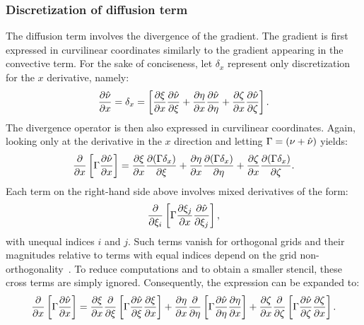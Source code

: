 \subsubsection{Discretization of diffusion term}
%
The diffusion term involves the divergence of the gradient. The gradient is first expressed in curvilinear coordinates similarly to the gradient appearing in the convective term. For the sake of conciseness, let $\delta_x$ represent only discretization for the $x$ derivative, namely:
\begin{equation*}
    \pdiff{\sa}{x} = \delta_x =
    \left[
        \pdiff{\xi}{x}\pdiff{\sa}{\xi} + \pdiff{\eta}{x}\pdiff{\sa}{\eta} +
            \pdiff{\zeta}{x}\pdiff{\sa}{\zeta}
    \right].
\end{equation*}
The divergence operator is then also expressed in curvilinear coordinates. Again, looking only at the derivative in the $x$ direction and letting $\Gamma = (\nu + \sa)$ yields:
\begin{equation*}
    \pdiff{}{x}\left[\Gamma\pdiff{\sa}{x}\right]
    =
    \pdiff{\xi}{x}\pdiff{(\Gamma\delta_x)}{\xi}
    + \pdiff{\eta}{x}\pdiff{(\Gamma\delta_x)}{\eta}
    + \pdiff{\zeta}{x}\pdiff{(\Gamma\delta_x)}{\zeta}.
\end{equation*}
Each term on the right-hand side above involves mixed derivatives of the form:
\begin{equation}
    \pdiff{}{\xi_i}\left[
        \Gamma\pdiff{\xi_j}{x}\pdiff{\sa}{\xi_j}
    \right],
\end{equation}
with unequal indices $i$ and $j$. Such terms vanish for orthogonal grids and their magnitudes relative to terms with equal indices depend on the grid non-orthogonality~\cite{ferziger2012computational}. To reduce computations and to obtain a smaller stencil, these cross terms are simply ignored. Consequently, the expression can be expanded to:
\begin{equation*}
    \pdiff{}{x}\left[\Gamma\pdiff{\sa}{x}\right] = \pdiff{\xi}{x}\pdiff{}{\xi}\left[
        \Gamma\pdiff{\sa}{\xi}\pdiff{\xi}{x}
    \right]
    +
    \pdiff{\eta}{x}\pdiff{}{\eta}\left[
        \Gamma\pdiff{\sa}{\eta}\pdiff{\eta}{x}
    \right]
    +
    \pdiff{\zeta}{x}\pdiff{}{\zeta}\left[
        \Gamma\pdiff{\sa}{\zeta}\pdiff{\zeta}{x}
    \right].
\end{equation*}

